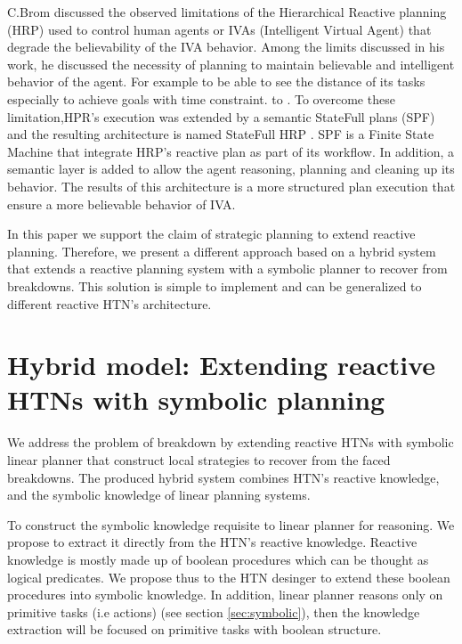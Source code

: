 \documentclass[conference]{IEEEtran}
\begin{document}
	C.Brom \cite{brom2005hierarchical} discussed the observed limitations of the  Hierarchical Reactive planning (HRP) used to control human agents or IVAs (Intelligent Virtual Agent) that degrade the believability of the IVA behavior. Among the limits discussed in his work, he discussed the necessity of planning to maintain believable and intelligent behavior of the agent. For example to be able to see the distance of its tasks especially to achieve goals with time constraint. to . To overcome these limitation,HPR's execution was extended by a semantic StateFull plans (SPF) and the resulting architecture is named StateFull HRP \cite{plchtowards}.  SPF is a Finite State Machine that integrate HRP's reactive plan as part of its workflow. In addition, a semantic layer is added to allow the agent reasoning, planning and cleaning up its behavior. The results of this architecture is a more structured plan execution that ensure a more believable behavior of IVA.   
	\par In this paper we support the claim of strategic planning to extend reactive planning. Therefore, we present a different approach based on a hybrid system that extends a reactive planning system with a symbolic planner to recover from breakdowns. This solution is simple to implement and can be generalized to different reactive HTN's architecture. 

	
	
	\section{Hybrid model: Extending reactive HTNs with symbolic planning}
	\label{solution}
	\par We address the problem of breakdown  by extending reactive HTNs with symbolic linear planner that construct local strategies to recover from the faced breakdowns.
	The produced hybrid system combines HTN's reactive knowledge, and the symbolic knowledge of linear planning systems.
	\par To construct the symbolic knowledge requisite to  linear planner for reasoning. We propose to  extract it directly from the HTN's reactive knowledge. Reactive knowledge is mostly made up of boolean procedures which can be thought as logical predicates. We propose thus to the HTN desinger to extend these boolean procedures into  symbolic knowledge. In addition, linear planner reasons only on primitive tasks (i.e actions) (see section \ref{sec:symbolic}), then the knowledge extraction will be focused on primitive tasks with boolean structure.
\end{document}
